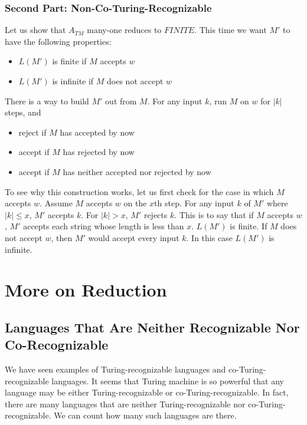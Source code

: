 \documentclass[11pt]{article}
\begin{document}
\subsubsection{Second Part: Non-Co-Turing-Recognizable}

Let us show that $A_{TM}$ many-one reduces to $FINITE$. This time we want $M'$ to have the following
properties:
\begin{itemize}
\item $L(M')$ is finite if $M$ accepts $w$
\item $L(M')$ is infinite if $M$ does not accept $w$
\end{itemize}

There is a way to build $M'$ out from $M$. For any input $k$, run $M$ on $w$ for $|k|$ steps, and
\begin{itemize}
\item reject if $M$ has accepted by now
\item accept if $M$ has rejected by now
\item accept if $M$ has neither accepted nor rejected by now
\end{itemize}

To see why this construction works, let us first check for the case in which $M$ accepts $w$. Assume
$M$ accepts $w$ on the $x$th step. For any input $k$ of $M'$ where $|k| \leq x$, $M'$ accepts $k$.
For $|k| > x$, $M'$ rejects $k$. This is to say that if $M$ accepts $w$, $M'$ accepts each string
whose length is less than $x$. $L(M')$ is finite. If $M$ does not accept $w$, then $M'$ would accept
every input $k$. In this case $L(M')$ is infinite.

\section{More on Reduction}

\subsection{Languages That Are Neither Recognizable Nor Co-Recognizable}

We have seen examples of Turing-recognizable languages and co-Turing-recognizable languages. It seems
that Turing machine is so powerful that any language may be either Turing-recognizable or
co-Turing-recognizable. In fact, there are many languages that are neither Turing-recognizable
nor co-Turing-recognizable. We can count how many such languages are there.
\end{document}
